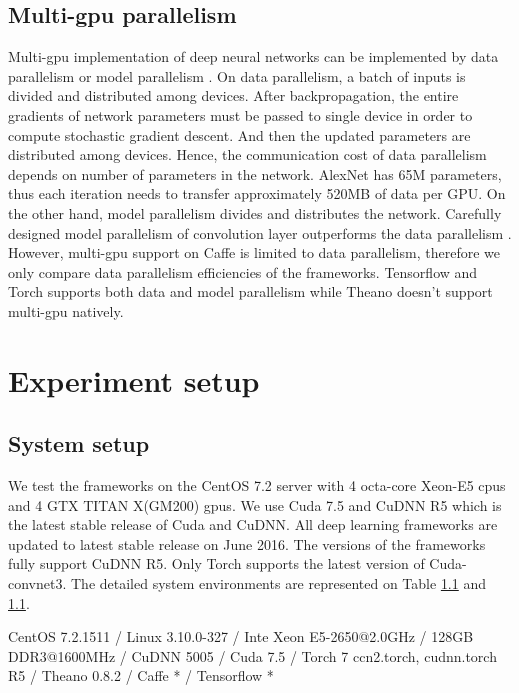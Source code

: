 \documentclass[conference]{IEEEtran}
\begin{document}
\subsection{Multi-gpu parallelism}
Multi-gpu implementation of deep neural networks can be implemented by data parallelism or model parallelism \cite{}.
On data parallelism, a batch of inputs is divided and distributed among devices.
After backpropagation, the entire gradients of network parameters must be passed to single device in order to compute stochastic gradient descent.
And then the updated parameters are distributed among devices.
Hence, the communication cost of data parallelism depends on number of parameters in the network.
AlexNet has 65M parameters, thus each iteration needs to transfer approximately 520MB of data per GPU.
On the other hand, model parallelism divides and distributes the network.
Carefully designed model parallelism of convolution layer outperforms the data parallelism \cite{}.
However, multi-gpu support on Caffe is limited to data parallelism, therefore we only compare data parallelism efficiencies of the frameworks.
Tensorflow and Torch supports both data and model parallelism while Theano doesn’t support multi-gpu natively.

\section{Experiment setup}

\subsection{System setup}
We test the frameworks on the CentOS 7.2 server with 4 octa-core Xeon-E5 cpus and 4 GTX TITAN X(GM200) gpus.
We use Cuda 7.5 and CuDNN R5 which is the latest stable release of Cuda and CuDNN.
All deep learning frameworks are updated to latest stable release on June 2016.
The versions of the frameworks fully support CuDNN R5.
Only Torch supports the latest version of Cuda-convnet3.
The detailed system environments are represented on Table \ref{} and \ref{}.

CentOS 7.2.1511 / Linux 3.10.0-327 / Inte Xeon E5-2650@2.0GHz / 128GB DDR3@1600MHz / CuDNN 5005 / Cuda 7.5 / Torch 7 ccn2.torch, cudnn.torch R5 / Theano 0.8.2 / Caffe * / Tensorflow *
\end{document}
